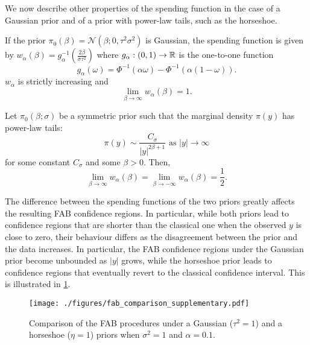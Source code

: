 We now describe other properties of the spending function in the case of a Gaussian prior and of a prior with power-law tails, such as the horseshoe.
\begin{proposition}
    \label{prop:fabgaussianprop}
    If the prior $\pi_0(\beta)=\mathcal N(\beta;0,\tau^2\sigma^2)$ is Gaussian, the spending function is given by $w_\alpha(\beta)=g_\alpha^{-1}\left(\frac{2\beta}{\sigma\tau^2}\right)$ where $g_\alpha:(0,1)\to\mathbb R$ is the one-to-one function
    \begin{equation}
        g_\alpha(\omega)=\Phi^{-1}(\alpha \omega)-\Phi^{-1}(\alpha(1-\omega)).
        \label{eq:galpha}
    \end{equation}
    $w_\alpha$ is strictly increasing and
    $$
        \lim_{\beta\to\infty} w_\alpha(\beta)=1.
    $$%
\end{proposition}
\begin{proposition}\label{prop:horseshoefab}
    Let $\pi_0(\beta;\sigma)$ be a symmetric prior such that the marginal density $\pi(y)$ has power-law tails:
    $$
        \pi(y)\sim \frac{C_\sigma}{|y|^{2\beta+1}} \text{ as }|y|\to\infty
    $$
    for some constant $C_\sigma$ and some $\beta>0$. Then,
    $$
        \lim_{\beta\to\infty} w_\alpha(\beta)=\lim_{\beta\to -\infty} w_\alpha(\beta)=\frac{1}{2}.
    $$
\end{proposition}
The difference between the spending functions of the two priors greatly affects the resulting FAB confidence regions. In particular, while both priors lead to confidence regions that are shorter than the classical one when the observed $y$ is close to zero, their behaviour differs as the disagreement between the prior and the data increases. In particular, the FAB confidence regions under the Gaussian prior become unbounded as $|y|$ grows, while the horseshoe prior leads to confidence regions that eventually revert to the classical confidence interval. This is illustrated in \cref{fig:fab_comparison_supplementary}.
\begin{figure}
    \centering
    \texttt{[image: ./figures/fab\_comparison\_supplementary.pdf]}
    \caption{Comparison of the FAB procedures under a Gaussian ($\tau^2 = 1$) and a horseshoe ($\eta = 1$) priors when $\sigma^2 = 1$ and $\alpha = 0.1$.}
    \label{fig:fab_comparison_supplementary}
\end{figure}
